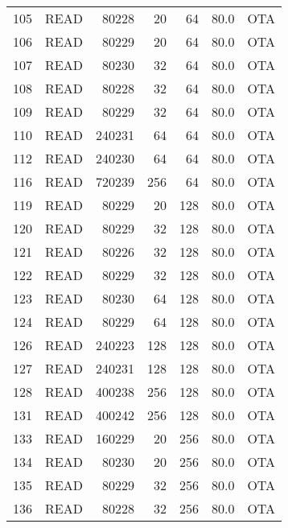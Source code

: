 \begin{longtable}{llrrrrl}
105 &         READ &     80228 &         20 &        64 &           80.0 &  OTA \\
106 &         READ &     80229 &         20 &        64 &           80.0 &  OTA \\
107 &         READ &     80230 &         32 &        64 &           80.0 &  OTA \\
108 &         READ &     80228 &         32 &        64 &           80.0 &  OTA \\
109 &         READ &     80229 &         32 &        64 &           80.0 &  OTA \\
110 &         READ &    240231 &         64 &        64 &           80.0 &  OTA \\
112 &         READ &    240230 &         64 &        64 &           80.0 &  OTA \\
116 &         READ &    720239 &        256 &        64 &           80.0 &  OTA \\
119 &         READ &     80229 &         20 &       128 &           80.0 &  OTA \\
120 &         READ &     80229 &         32 &       128 &           80.0 &  OTA \\
121 &         READ &     80226 &         32 &       128 &           80.0 &  OTA \\
122 &         READ &     80229 &         32 &       128 &           80.0 &  OTA \\
123 &         READ &     80230 &         64 &       128 &           80.0 &  OTA \\
124 &         READ &     80229 &         64 &       128 &           80.0 &  OTA \\
126 &         READ &    240223 &        128 &       128 &           80.0 &  OTA \\
127 &         READ &    240231 &        128 &       128 &           80.0 &  OTA \\
128 &         READ &    400238 &        256 &       128 &           80.0 &  OTA \\
131 &         READ &    400242 &        256 &       128 &           80.0 &  OTA \\
133 &         READ &    160229 &         20 &       256 &           80.0 &  OTA \\
134 &         READ &     80230 &         20 &       256 &           80.0 &  OTA \\
135 &         READ &     80229 &         32 &       256 &           80.0 &  OTA \\
136 &         READ &     80228 &         32 &       256 &           80.0 &  OTA \\

\end{longtable}

